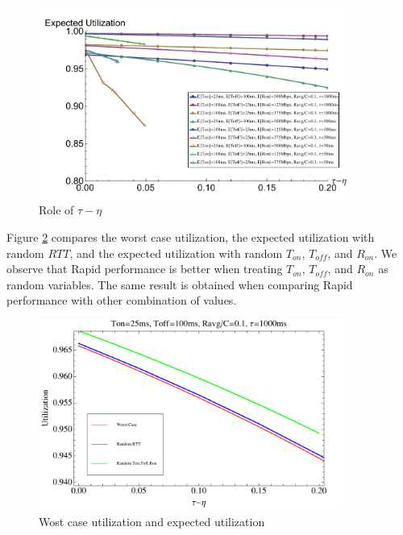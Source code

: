   \begin{figure}[!htb]
    \centering
    \includegraphics[width=0.9\textwidth]{img/taueta.pdf}
    \caption{Role of $\tau - \eta$}
    \label{taueta}
  \end{figure}

  Figure \ref{comparison} compares the worst case utilization, the expected 
  utilization with random $RTT$, and the expected utilization with random 
  $T_{on}$, $T_{off}$, and $R_{on}$. We observe that Rapid performance is 
  better when treating $T_{on}$, $T_{off}$, and $R_{on}$ as random variables.
  The same result is obtained when comparing Rapid performance with other 
  combination of values.
  \begin{figure}[!htb]
    \centering
    \includegraphics[width=0.9\textwidth]{img/comparison.pdf}
    \caption{Wost case utilization and expected utilization}
    \label{comparison}
  \end{figure}

